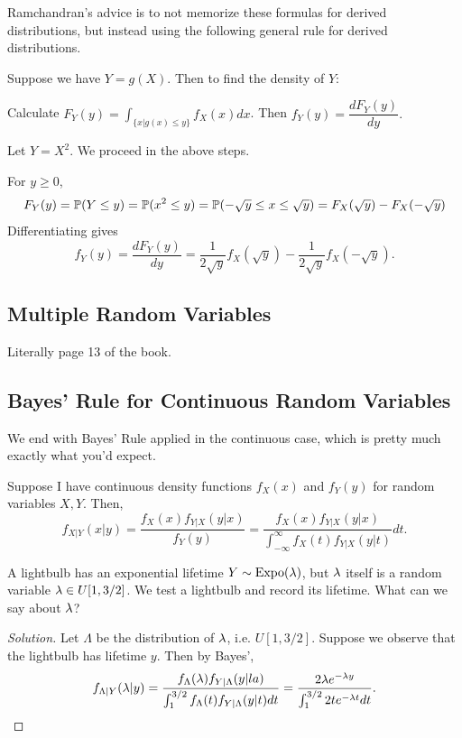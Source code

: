 \documentclass[11 pt]{scrartcl}
\begin{document}
Ramchandran's advice is to not memorize these formulas for derived distributions, but instead using the following general rule for derived distributions. 

\begin{theorem}
    Suppose we have $Y = g(X)$. Then to find the density of $Y$:  
    \begin{enumerate}
        \ii Calculate $F_Y(y) = \int_{\{x | g(x) \leq y\}} f_X(x) dx$. 
        \ii Then $f_Y(y) = \dfrac{dF_Y(y)}{dy}.$ 
    \end{enumerate}
\end{theorem}

\begin{example}
    Let $Y = X^2$. We proceed in the above steps. 
    \begin{enumerate}
        \ii For $y\geq 0$, 
        \[ F_Y(y) = \mathbb P(Y\leq y) = \mathbb P(x^2 \leq y) = \mathbb P(-\sqrt{y}\leq x \leq \sqrt{y}) = F_X(\sqrt{y}) - F_X(-\sqrt{y}) \]
        \ii Differentiating gives 
        \[ f_Y(y) = \dfrac{dF_Y(y)}{dy} = \dfrac{1}{2\sqrt{y}}f_X(\sqrt{y}) - \dfrac{1}{2\sqrt{y}}f_X(-\sqrt{y}).\] 
    \end{enumerate}
\end{example}

\subsection{Multiple Random Variables}
Literally page 13 of the book. 

\subsection{Bayes' Rule for Continuous Random Variables}
We end with Bayes' Rule applied in the continuous case, which is pretty much exactly what you'd expect.
\begin{theorem}
    Suppose I have continuous density functions $f_X(x)$ and $f_Y(y)$ for random variables $X,Y$. Then, 
    \[ f_{X|Y}(x|y) = \dfrac{f_X(x)f_{Y|X}(y|x)}{f_Y(y)} = \dfrac{f_X(x)f_{Y|X}(y|x)}{\int_{-\infty}^\infty f_X(t)f_{Y|X}(y|t)} dt.\]
\end{theorem}

\begin{example}
    A lightbulb has an exponential lifetime $Y\sim \text{Expo}(\lambda)$, but $\lambda$ itself is a random variable $\lambda \in U[1, 3/2]$. We test a lightbulb and record its lifetime. What can we say about $\lambda$? 
\begin{proof}[Solution]
    Let $\Lambda$ be the distribution of $\lambda$, i.e. $U[1, 3/2]$. Suppose we observe that the lightbulb has lifetime $y$. Then by Bayes', 
    \[ f_{\Lambda|Y}(\lambda | y) = \dfrac{f_{\Lambda}(\lambda) f_{Y|\Lambda}(y|la)}{\int_1^{3/2} f_{\Lambda}(t) f_{Y|\Lambda}(y|t)dt } = \dfrac{2\lambda e^{-\lambda y}}{\int_1^{3/2}2te^{-\lambda t}dt}. \]
\end{proof}
\end{example}
\end{document}
